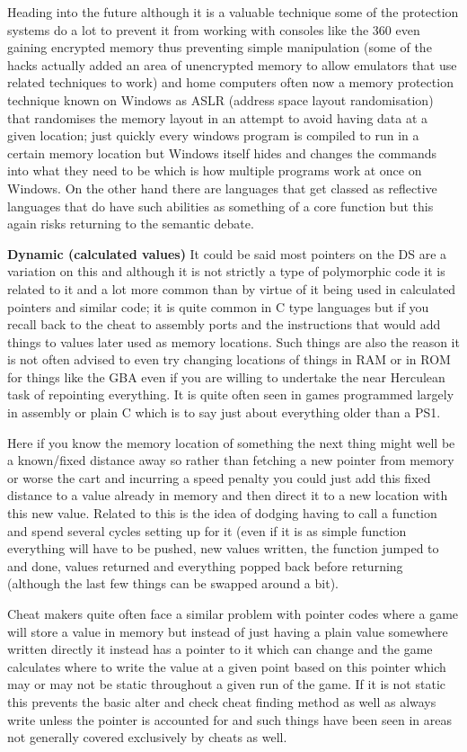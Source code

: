 \documentclass[
]{book}
\begin{document}
Heading into the future although it is a valuable technique some of the protection systems do a lot to prevent it from working with consoles like the 360 even gaining encrypted memory thus preventing simple manipulation (some of the hacks actually added an area of unencrypted memory to allow emulators that use related techniques to work) and home computers often now a memory protection technique known on Windows as ASLR (address space layout randomisation) that randomises the memory layout in an attempt to avoid having data at a given location; just quickly every windows program is compiled to run in a certain memory location but Windows itself hides and changes the commands into what they need to be which is how multiple programs work at once on Windows. On the other hand there are languages that get classed as reflective languages that do have such abilities as something of a core function but this again risks returning to the semantic debate.

\textbf{Dynamic (calculated values)} It could be said most pointers on the DS are a variation on this and although it is not strictly a type of polymorphic code it is related to it and a lot more common than by virtue of it being used in calculated pointers and similar code; it is quite common in C type languages but if you recall back to the cheat to assembly ports and the instructions that would add things to values later used as memory locations. Such things are also the reason it is not often advised to even try changing locations of things in RAM or in ROM for things like the GBA even if you are willing to undertake the near Herculean task of repointing everything. It is quite often seen in games programmed largely in assembly or plain C which is to say just about everything older than a PS1.

Here if you know the memory location of something the next thing might well be a known/fixed distance away so rather than fetching a new pointer from memory or worse the cart and incurring a speed penalty you could just add this fixed distance to a value already in memory and then direct it to a new location with this new value. Related to this is the idea of dodging having to call a function and spend several cycles setting up for it (even if it is as simple function everything will have to be pushed, new values written, the function jumped to and done, values returned and everything popped back before returning (although the last few things can be swapped around a bit).

Cheat makers quite often face a similar problem with pointer codes where a game will store a value in memory but instead of just having a plain value somewhere written directly it instead has a pointer to it which can change and the game calculates where to write the value at a given point based on this pointer which may or may not be static throughout a given run of the game. If it is not static this prevents the basic alter and check cheat finding method as well as always write unless the pointer is accounted for and such things have been seen in areas not generally covered exclusively by cheats as well.
\end{document}
